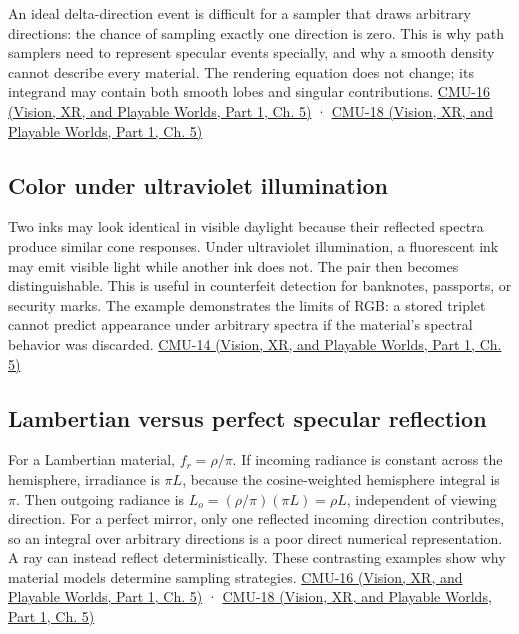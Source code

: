 An ideal delta-direction event is difficult for a sampler that draws arbitrary directions: the chance of sampling exactly one direction is zero. This is why path samplers need to represent specular events specially, and why a smooth density cannot describe every material. The rendering equation does not change; its integrand may contain both smooth lobes and singular contributions. \href{../07-Vision-XR-and-Playable-Worlds-P01/main.pdf\#04-visual-computing-ii-ch036-cmu-16---the-rendering-equation}{CMU-16 (Vision, XR, and Playable Worlds, Part 1, Ch. 5)} · \href{../07-Vision-XR-and-Playable-Worlds-P01/main.pdf\#04-visual-computing-ii-ch036-cmu-18---monte-carlo-rendering}{CMU-18 (Vision, XR, and Playable Worlds, Part 1, Ch. 5)}

\subsection{Color under ultraviolet illumination}\label{03-visual-computing-i-ch006-color-under-ultraviolet-illumination}

\hypertarget{03-visual-computing-i-ch006-color-under-ultraviolet-illumination}{}

Two inks may look identical in visible daylight because their reflected spectra produce similar cone responses. Under ultraviolet illumination, a fluorescent ink may emit visible light while another ink does not. The pair then becomes distinguishable. This is useful in counterfeit detection for banknotes, passports, or security marks. The example demonstrates the limits of RGB: a stored triplet cannot predict appearance under arbitrary spectra if the material's spectral behavior was discarded. \href{../07-Vision-XR-and-Playable-Worlds-P01/main.pdf\#04-visual-computing-ii-ch036-cmu-14---color}{CMU-14 (Vision, XR, and Playable Worlds, Part 1, Ch. 5)}

\subsection{Lambertian versus perfect specular reflection}\label{03-visual-computing-i-ch006-lambertian-versus-perfect-specular-reflection}

\hypertarget{03-visual-computing-i-ch006-lambertian-versus-perfect-specular-reflection}{}

For a Lambertian material, \(f_r=\rho/\pi\). If incoming radiance is constant across the hemisphere, irradiance is \(\pi L\), because the cosine-weighted hemisphere integral is \(\pi\). Then outgoing radiance is \(L_o=(\rho/\pi)(\pi L)=\rho L\), independent of viewing direction. For a perfect mirror, only one reflected incoming direction contributes, so an integral over arbitrary directions is a poor direct numerical representation. A ray can instead reflect deterministically. These contrasting examples show why material models determine sampling strategies. \href{../07-Vision-XR-and-Playable-Worlds-P01/main.pdf\#04-visual-computing-ii-ch036-cmu-16---the-rendering-equation}{CMU-16 (Vision, XR, and Playable Worlds, Part 1, Ch. 5)} · \href{../07-Vision-XR-and-Playable-Worlds-P01/main.pdf\#04-visual-computing-ii-ch036-cmu-18---monte-carlo-rendering}{CMU-18 (Vision, XR, and Playable Worlds, Part 1, Ch. 5)}

